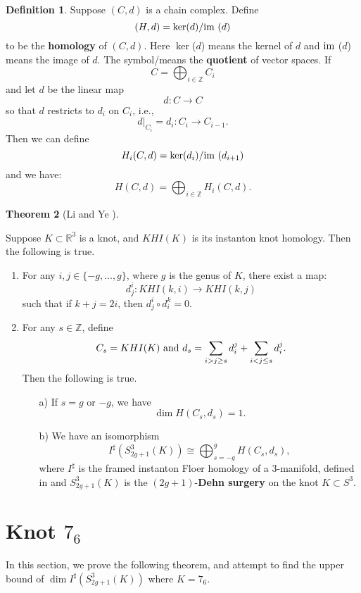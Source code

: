 \documentclass{amsart}
\newtheorem{thm}{Theorem}[section]
\theoremstyle{definition}
\newtheorem{defn}[thm]{Definition}
\newcommand{\im}{{\rm im~}}
\begin{document}
\begin{defn}
Suppose $(C,d)$ is a chain complex. Define
\[(H,d)=\ker (d)/\im (d)\]
to be the {\bf homology} of $(C,d)$. Here $\ker$($d$) means the kernel of $d$ and $\im$($d$) means the image of $d$.
The symbol/means the {\bf quotient} of vector spaces. If
\[C=\bigoplus_{i\in\mathbb{Z}} C_{i}\]
and let $d$ be the linear map
\[d:C\rightarrow C\]
so that $d$ restricts to $d_{i}$ on $C_{i}$, i.e.,
\[d|_{C_{i}}=d_{i}:C_{i}\rightarrow C_{i-1}.\]
Then we can define
\[H_{i}(C,d)=\ker (d_{i})/\im (d_{i+1})\]
and we have:
\[H(C,d)=\bigoplus_{i\in\mathbb{Z}} H_{i}(C,d).\]
\end{defn}

\begin{thm} [Li and Ye \cite{LY2020}]\label{thm: Li-Ye}
\end{thm}
Suppose $K\subset \mathbb{R}^3$ is a knot, and $KHI(K)$ is its instanton knot homology. Then the following is true.
\begin{enumerate}
\item
For any $i,j\in \{-g,...,g\}$, where $g$ is the genus of $K$, there exist a map:
\[d^{i}_{j}:KHI(k,i)\rightarrow KHI(k,j)\]
such that if $k+j=2i$, then $d^{i}_{j}\circ d^{k}_{i}=0$.
\item
For any $s\in\mathbb{Z}$, define
\[C_s=KHI(K){\rm~and~}d_s=\sum_{i>j\geq s}d^j_i+\sum_{i<j\leq s}d^j_i.\]
Then the following is true.
\begin{itemize}
\item [a)] If $s=g$ or $-g$, we have
\[\dim H(C_s,d_s)=1.\]
\item [b)] We have an isomorphism
\begin{equation}\label{eq: bent complex}
I^{\sharp}(S^3_{2g+1}(K))\cong\bigoplus_{s=-g}^g H(C_s,d_s),
\end{equation}
where $I^{\sharp}$ is the framed instanton Floer homology of a $3$-manifold, defined in \cite{kronheimer2010instanton} and $S^{3}_{2g+1}(K)$ is the $(2g+1)$-{\bf Dehn surgery} on the knot $K\subset S^3$.
\end{itemize}
\end{enumerate}






\section{Knot $7_6$}\label{sec3}
In this section, we prove the following theorem, and attempt to find the upper bound of $\dim I^{\sharp}(S^3_{2g+1}(K))$ where $ K = 7_6$. 
\end{document}
